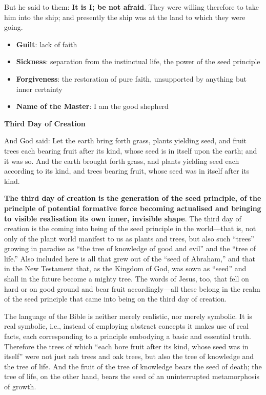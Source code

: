 But he said to them: \textbf{It is I; be not afraid}. They were willing therefore to take him into the ship; and presently the ship was at the land to which they were going.

\begin{itemize}
\item \textbf{Guilt}: lack of faith 
\item \textbf{Sickness}: separation from the instinctual life, the power of the seed principle 
\item \textbf{Forgiveness}: the restoration of pure faith, unsupported by anything but inner certainty 
\item \textbf{Name of the Master}: I am the good shepherd 
\end{itemize}
\textbf{Third Day of Creation}

And God said: Let the earth bring forth grass, plants yielding seed, and fruit trees each bearing fruit after its kind, whose seed is in itself upon the earth; and it was so. And the earth brought forth grass, and plants yielding seed each according to its kind, and trees bearing fruit, whose seed was in itself after its kind.

\textbf{The third day of creation is the generation of the seed principle, of the principle of potential formative force becoming actualised and bringing to visible realisation its own inner, invisible shape}. The third day of creation is the coming into being of the seed principle in the world—that is, not only of the plant world manifest to us as plants and trees, but also such ``trees'' growing in paradise as ``the tree of knowledge of good and evil'' and the ``tree of life.'' Also included here is all that grew out of the ``seed of Abraham,'' and that in the New Testament that, as the Kingdom of God, was sown as ``seed'' and shall in the future become a mighty tree. The words of Jesus, too, that fell on hard or on good ground and bear fruit accordingly—all these belong in the realm of the seed principle that came into being on the third day of creation.

The language of the Bible is neither merely realistic, nor merely symbolic. It is real symbolic, i.e., instead of employing abstract concepts it makes use of real facts, each corresponding to a principle embodying a basic and essential truth. Therefore the trees of which ``each bore fruit after its kind, whose seed was in itself'' were not just ash trees and oak trees, but also the tree of knowledge and the tree of life. And the fruit of the tree of knowledge bears the seed of death; the tree of life, on the other hand, bears the seed of an uninterrupted metamorphosis of growth.

